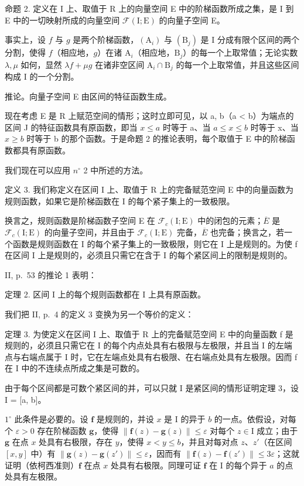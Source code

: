 命题 2. 定义在 I 上、取值于 R 上的向量空间 E 中的阶梯函数所成之集，是 I 到 E 中的一切映射所成的向量空间 \(\mathcal{F}(\mathrm{I};\mathrm{E})\) 的向量子空间 E。

事实上，设 \(f\) 与 \(g\) 是两个阶梯函数，\((\mathrm{A}_i)\) 与 \((\mathrm{B}_j)\) 是 I 分成有限个区间的两个分割，使得 \(f\)（相应地，\(g\)）在诸 \(\mathrm{A}_i\)（相应地，\(\mathrm{B}_j\)）的每一个上取常值；无论实数 \(\lambda, \mu\) 如何，显然 \(\lambda f + \mu g\) 在诸非空区间 \(\mathrm{A}_i \cap \mathrm{B}_j\) 的每一个上取常值，并且这些区间构成 I 的一个分割。

推论。向量子空间 E 由区间的特征函数生成。

现在考虑 E 是 R 上赋范空间的情形；这时立即可见，以 a, b（a \textless{} b）为端点的区间 J 的特征函数具有原函数，即当 \(x \leqslant a\) 时等于 a、当 \(a \leqslant x \leqslant b\) 时等于 x、当 \(x \geqslant b\) 时等于 b 的那个函数。于是命题 2 的推论表明，每个取值于 E 中的阶梯函数都具有原函数。

我们现在可以应用 \(n^{\circ}\) 2 中所述的方法。

定义 3. 我们称定义在区间 I 上、取值于 R 上的完备赋范空间 E 中的向量函数为规则函数，如果它是阶梯函数在 I 的每个紧子集上的一致极限。

换言之，规则函数是阶梯函数子空间 E 在 \(\mathcal{F}_{c}(\mathrm{I};\mathrm{E})\) 中的闭包的元素；\(\overline{E}\) 是 \(\mathcal{F}_{c}(\mathrm{I};\mathrm{E})\) 的向量子空间，并且由于 \(\mathcal{F}_{c}(\mathrm{I};\mathrm{E})\) 完备，\(\overline{E}\) 也完备；换言之，若一个函数是规则函数在 I 的每个紧子集上的一致极限，则它在 I 上是规则的。为使 f 在区间 I 上是规则的，必须且只需它在含于 I 的每个紧区间上的限制是规则的。

II, p.~53 的推论 1 表明：

定理 2. 区间 I 上的每个规则函数都在 I 上具有原函数。

我们把 II, p.~4 的定义 3 变换为另一个等价的定义：

定理 3. 为使定义在区间 I 上、取值于 R 上的完备赋范空间 E 中的向量函数 f 是规则的，必须且只需它在 I 的每个内点处具有右极限与左极限，并且当 I 的左端点与右端点属于 I 时，它在左端点处具有右极限、在右端点处具有左极限。因而 f 在 I 中的不连续点所成之集是可数的。

由于每个区间都是可数个紧区间的并，可以只就 I 是紧区间的情形证明定理 3，设 I = {[}a, b{]}。

\(1^{\circ}\) 此条件是必要的。设 \(\mathbf{f}\) 是规则的，并设 \(x\) 是 I 的异于 \(b\) 的一点。依假设，对每个 \(\varepsilon > 0\) 存在阶梯函数 \(\mathbf{g}\)，使得 \(\| \mathbf{f}(z) - \mathbf{g}(z) \| \leqslant \varepsilon\) 对每个 \(z \in \mathrm{I}\) 成立；由于 \(\mathbf{g}\) 在点 \(x\) 处具有右极限，存在 \(y\)，使得 \(x < y \leqslant b\)，并且对每对点 \(z\)、\(z'\)（在区间 \([x, y]\) 中）有 \(\| \mathbf{g}(z) - \mathbf{g}(z') \| \leqslant \varepsilon\)，因而有 \(\| \mathbf{f}(z) - \mathbf{f}(z') \| \leqslant 3\varepsilon\)；这就证明（依柯西准则）\(\mathbf{f}\) 在点 \(x\) 处具有右极限。同理可证 \(\mathbf{f}\) 在 I 的每个异于 \(a\) 的点处具有左极限。

